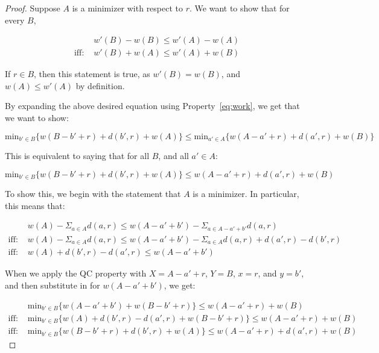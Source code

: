 \begin{proof}
    Suppose $A$ is a minimizer with respect to $r$. We want to show that for every $B$,

    \begin{equation*}
        \begin{split}
            &w'(B) - w(B) \leq w'(A) - w(A) \\
            \text{iff: }&w'(B) + w(A) \leq w'(A) + w(B)
        \end{split}
    \end{equation*}

    If $r \in B$, then this statement is true, as $w'(B) = w(B)$, and $w(A) \leq w'(A)$ by definition.

    By expanding the above desired equation using Property~\eqref{eq:work}, we get that we want to show:

    \begin{equation*}
        \mathrm{min}_{b' \in B} \{ w(B - b' + r) + d(b', r) + w(A)\} \leq \mathrm{min}_{a' \in A} \{ w(A - a' + r) + d(a', r) + w(B)\}
    \end{equation*}

    This is equivalent to saying that for all $B$, and all $a' \in A$: 

    \begin{equation*}
        \mathrm{min}_{b' \in B} \{ w(B - b' + r) + d(b', r) + w(A)\} \leq w(A - a' + r) + d(a', r) + w(B)
    \end{equation*}

    To show this, we begin with the statement that $A$ is a minimizer. In particular, this means that:

    \begin{equation*}
        \begin{split}
            &w(A) - \Sigma_{a \in A} d(a,r) \leq w(A -a' + b') - \Sigma_{a \in A - a' + b'} d(a,r) \\
            \text{iff: }&w(A) - \Sigma_{a \in A} d(a,r) \leq w(A -a' + b') - \Sigma_{a \in A} d(a,r) + d(a', r) - d(b', r) \\
            \text{iff: }&w(A) + d(b', r) - d(a', r) \leq w(A - a' + b')
        \end{split}
    \end{equation*}

    When we apply the QC property with $X = A - a' + r$, $Y = B$, $x = r$, and $y = b'$, and then substitute in for $w(A - a' + b')$, we get:

    \begin{equation*}
        \begin{split}
            &\mathrm{min}_{b' \in B} \{ w(A - a' + b') + w(B - b' + r)\} \leq w(A - a' + r) + w(B) \\
            \text{iff: }&\mathrm{min}_{b' \in B} \{ w(A) + d(b', r) - d(a', r) + w(B - b' + r)\}\leq w(A - a' + r) + w(B) \\
            \text{iff: }&\mathrm{min}_{b' \in B} \{ w(B - b' + r) + d(b', r) + w(A)\} \leq w(A - a' + r) + d(a', r) + w(B)
        \end{split}
    \end{equation*}
\end{proof}

